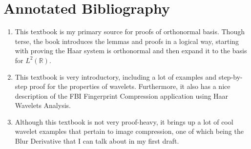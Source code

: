 \documentclass[11pt]{amsart}
\theoremstyle{theorem} %
\theoremstyle{definition}
\theoremstyle{example}
\theoremstyle{remark}
\numberwithin{equation}{section}
\newcommand{\R}{\mathbb{R}}
\begin{document}
\section{Annotated Bibliography}
\begin{enumerate}
	\item {}
	
	\smallskip
	This textbook is my primary source for proofs of orthonormal basis. Though terse, the book introduces the lemmas and proofs in a logical way, starting with proving the Haar system is orthonormal and then expand it to the basis for $L^2(\R)$.
	
	\item {}
	
	\smallskip
	This textbook is very introductory, including a lot of examples and step-by-step proof for the properties of wavelets. Furthermore, it also has a nice description of the FBI Fingerprint Compression application using Haar Wavelets Analysis.	
	
	\item {}
	
	\smallskip
	Although this textbook is not very proof-heavy, it brings up a lot of cool wavelet examples that pertain to image compression, one of which being the Blur Derivative that I can talk about in my first draft.
\end{enumerate}	
	
\end{document}
